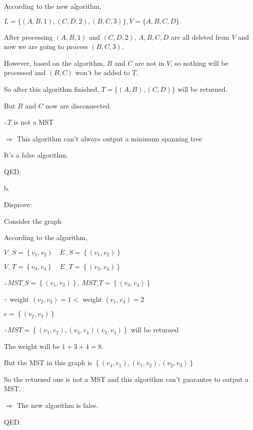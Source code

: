 \documentclass[12pt]{article}
\begin{document}
According to the new algorithm,

$L=\{(A, B, 1),(C, D, 2),(B, C, 3)\}, V=\{A, B, C, D\}$


After processing $(A,B,1)$ and $(C, D, 2)$, $A, B, C, D$ are all deleted from $V$ and now we are going to process $(B,C,3)$.

However, based on the algorithm, $B$ and $C$ are not in $V$, so nothing will be processed and $(B, C)$ won't be added to $T$.

So after this algorithm finished, $T=\{(A, B), (C, D)\}$ will be returned.

But $B$ and $C$ now are disconnected.

$\therefore T$ is not a MST

$\Rightarrow$ This algorithm can't always output a minimum spanning tree 

It's a false algorithm.

QED.

b. 

Disprove:

Consider the graph 
\begin{center}
\end{center}

According to the algorithm,

$ V_{-} S=\left\{v_1, v_2\right) \quad E_{-} S=\left\{\left(v_1, v_2\right)\right\}$

$ V_{-}T=\left\{v_3, v_4\right\} \quad E_{-} T=\left\{\left(v_3, v_4\right)\right\}$

$ \therefore M S T\_S=\left\{\left(v_1, v_2\right)\right\} $, $ M S T\_T=\left\{\left(v_3, v_4\right)\right\}$

$\because$ weight $\left(v_2, v_3\right)=1<$ weight $\left(v_1, v_4\right)=2 $

$e=\left\{\left(v_2, v_3\right)\right\}$

$ \therefore M S T=\left\{\left(v_1, v_2\right),\left(v_3, v_4\right)\left(v_2, v_3\right)\right\}$ will be returned

The weight will be $1+3+4=8$.

But the MST in this graph is $\left\{\left(v_4, v_1\right),\left(v_1, v_2\right),\left(v_2, v_3\right)\right\}$

So the returned one is not a MST
and this algorithm can't guarantee to output a MST.

$\Rightarrow$ The new algorithm is false.

QED.
\end{document}
